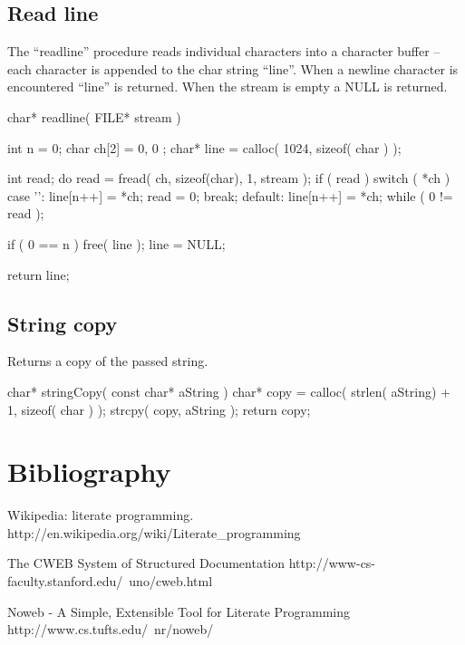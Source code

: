 \documentclass[]{article}
\begin{document}
\subsection{		Read line}

The ``readline'' procedure reads individual characters into a character buffer --
each character is appended to the char string ``line''.
When a newline character is encountered ``line'' is returned.
When the stream is empty a NULL is returned.

\begin{verbatimtab}
char* readline( FILE* stream )
{
	int  n = 0;
	char ch[2] = { 0, 0 };
	char* line = calloc( 1024, sizeof( char ) );

	int read;
	do
	{
		read = fread( ch, sizeof(char), 1, stream );
		if ( read )
		{
			switch ( *ch )
			{
			case '\n':
				line[n++] = *ch;
				read = 0;
				break;
			default:
				line[n++] = *ch;
			}
		}
	}
	while ( 0 != read );

	if ( 0 == n )
	{
		free( line );
		line = NULL;
	}

	return line;
}

\end{verbatimtab}
\subsection{		String copy}

Returns a copy of the passed string.

\begin{verbatimtab}
char* stringCopy( const char* aString )
{
	char* copy = calloc( strlen( aString) + 1, sizeof( char ) );
	strcpy( copy, aString );
	return copy;
}

\end{verbatimtab}
\section*{	Bibliography}
\begin{thebibliography}{4}

	Wikipedia: literate programming. http://en.wikipedia.org/wiki/Literate_programming

		The CWEB System of Structured Documentation http://www-cs-faculty.stanford.edu/~uno/cweb.html

		Noweb - A Simple, Extensible Tool for Literate Programming http://www.cs.tufts.edu/~nr/noweb/

\end{thebibliography}
\end{document}

